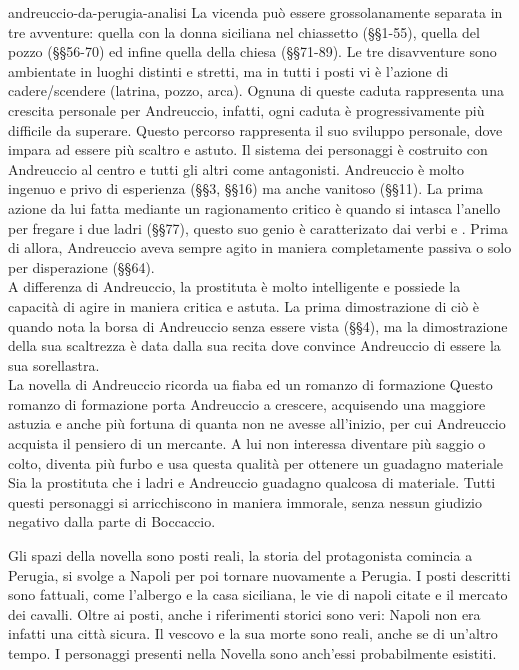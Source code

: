 \documentclass[preview]{standalone}
\begin{document}
\begin{snippet}{andreuccio-da-perugia-analisi}
    La vicenda può essere grossolanamente separata in tre avventure:
    quella con la donna siciliana nel chiassetto (§§1-55), quella del pozzo (§§56-70)
    ed infine quella della chiesa (§§71-89).
    Le tre disavventure sono ambientate in luoghi distinti e stretti,
    ma in tutti i posti vi è l'azione di cadere/scendere (latrina, pozzo, arca).
    Ognuna di queste caduta rappresenta una crescita personale per Andreuccio, infatti,
    ogni caduta è progressivamente più difficile da superare. Questo percorso rappresenta il suo
    sviluppo personale, dove impara ad essere più scaltro e astuto.
    Il sistema dei personaggi è costruito con Andreuccio al centro e tutti gli altri come antagonisti.
    Andreuccio è molto ingenuo e privo di esperienza (§§3, §§16) ma anche vanitoso (§§11).
    La prima azione da lui fatta mediante un ragionamento critico è quando si intasca l'anello per fregare i due ladri (§§77),
    questo suo genio è caratterizato dai verbi  e .
    Prima di allora, Andreuccio aveva sempre agito in maniera completamente passiva o solo per disperazione (§§64).
    \\
    A differenza di Andreuccio, la prostituta è molto intelligente e possiede la capacità di agire in maniera critica e astuta.
    La prima dimostrazione di ciò è quando nota la borsa di Andreuccio senza essere vista (§§4),
    ma la dimostrazione della sua scaltrezza è data dalla sua recita dove convince Andreuccio di essere la sua sorellastra.
    \\
    La novella di Andreuccio ricorda ua fiaba ed un romanzo di formazione
    Questo romanzo di formazione porta Andreuccio a crescere, acquisendo una maggiore astuzia e anche più fortuna di
    quanta non ne avesse all'inizio, per cui Andreuccio acquista il pensiero di un mercante.
    A lui non interessa diventare più saggio o colto, diventa più furbo e usa questa qualità per ottenere un guadagno materiale
    Sia la prostituta che i ladri e Andreuccio guadagno qualcosa di materiale.
    Tutti questi personaggi si arricchiscono in maniera immorale, senza nessun giudizio negativo dalla parte di Boccaccio.
    
    Gli spazi della novella sono posti reali, la storia del protagonista comincia a Perugia,
    si svolge a Napoli per poi tornare nuovamente a Perugia.
    I posti descritti sono fattuali, come l'albergo e la casa siciliana, le vie di napoli citate
    e il mercato dei cavalli.
    Oltre ai posti, anche i riferimenti storici sono veri: Napoli non era infatti una città sicura.
    Il vescovo e la sua morte sono reali, anche se di un'altro tempo. I personaggi presenti nella Novella
    sono anch'essi probabilmente esistiti.
\end{snippet}
\end{document}
